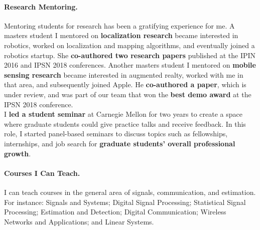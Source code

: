 \documentclass[10pt]{article}
\begin{document}
\paragraph{Research Mentoring. }
Mentoring students for research has been a gratifying experience for me. 
 A masters student I mentored on \textbf{localization research} became interested in robotics, worked on localization and mapping algorithms,  and eventually joined a robotics startup. She \textbf{ co-authored two research papers} published at the IPIN 2016 and IPSN 2018 conferences.
Another masters student I mentored on \textbf{mobile sensing research} became interested in augmented realty, worked with me in that area, and subsequently joined Apple. He \textbf{co-authored a paper}, which is under review, and was part of our team that won the \textbf{best demo award} at the IPSN 2018 conference.\\ %

I \textbf{led a student seminar} at Carnegie Mellon for two years to create a space where graduate students could give practice talks and receive feedback. In this role, I started panel-based seminars to discuss topics such as fellowships, internships, and job search for \textbf{graduate students' overall professional growth}. 



\paragraph{Courses I Can Teach. }
I can teach courses in the general area of signals, communication, and estimation. For instance: 
Signals and Systems; Digital Signal Processing; Statistical Signal Processing; Estimation and Detection; Digital Communication; Wireless Networks and Applications; and Linear Systems. 
\end{document}

